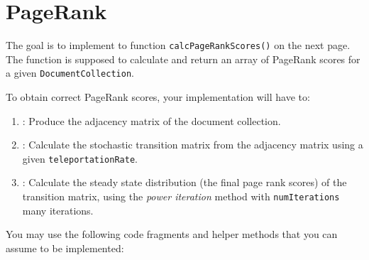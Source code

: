 \documentclass[exam, sectionseven, solution]{acAssignment}
\begin{document}
\section{PageRank}

The goal is to implement to function \texttt{calcPageRankScores()} on the next page.
The function is supposed to calculate and return an array of PageRank scores for a given \texttt{DocumentCollection}.

To obtain correct PageRank scores, your implementation will have to:
\begin{enumerate}
    \item {}: Produce the adjacency matrix of the document collection.
    \item {}: Calculate the stochastic transition matrix from the adjacency matrix using a given \texttt{teleportationRate}.
    \item {}: Calculate the steady state distribution (the final page rank scores) of the transition matrix, using the \emph{power iteration} method with \texttt{numIterations} many iterations.
\end{enumerate}

You may use the following code fragments and helper methods that you can assume to be implemented:
\end{document}
